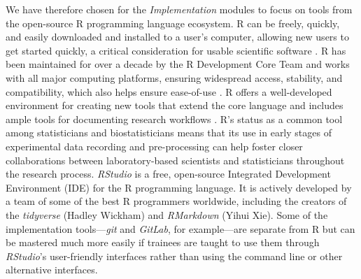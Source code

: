 \documentclass[pdftex,english,11.5pt,parskip=half]{scrartcl}
\begin{document}
We have therefore chosen for the \textit{Implementation} 
modules to focus on tools from the open-source R programming language ecosystem. R can be
freely, quickly, and easily downloaded and installed to a user's computer,
allowing new users to get started quickly, a critical consideration for usable
scientific software \cite{list2017ten}. R has been maintained for over a decade
by the R Development Core Team and works with all major computing platforms,
ensuring  widespread access, stability, and compatibility, which also helps ensure
ease-of-use \cite{baumer2018lessons, altschul2013anatomy}. R offers a
well-developed environment for creating new tools that extend the core language
\cite{wickham2015r, gentleman2004bioconductor} and includes ample tools for documenting research workflows
\cite{xie2015dynamic, xie2016bookdown}. R's status as a common tool among statisticians and biostatisticians means that its use in early stages of
experimental data recording and pre-processing can help foster closer
collaborations between laboratory-based scientists and statisticians throughout
the research process. \textit{RStudio} is a free, open-source Integrated Development Environment (IDE) for the R programming language. It is actively developed by a team of some of the best R programmers worldwide, including the creators of the \textit{tidyverse} (Hadley Wickham) and \textit{RMarkdown} (Yihui Xie). Some
of the implementation tools---\textit{git} and \textit{GitLab}, for example---are separate from R
but can be mastered much more easily if trainees are taught to use them through
\textit{RStudio}'s user-friendly interfaces rather than using the command line or other
alternative interfaces. 
\end{document}
